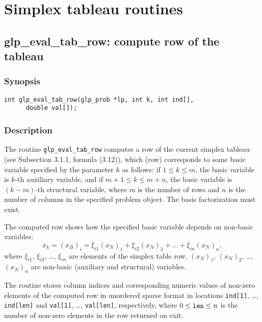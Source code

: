 
\newpage

\section{Simplex tableau routines}

\subsection{glp\_eval\_tab\_row: compute row of the tableau}

\subsubsection*{Synopsis}

\begin{verbatim}
int glp_eval_tab_row(glp_prob *lp, int k, int ind[],
      double val[]);
\end{verbatim}

\subsubsection*{Description}

The routine \verb|glp_eval_tab_row| computes a row of the current
simplex tableau (see Subsection 3.1.1, formula (3.12)), which (row)
corresponds to some basic variable specified by the parameter $k$ as
follows: if $1\leq k\leq m$, the basic variable is $k$-th auxiliary
variable, and if $m+1\leq k\leq m+n$, the basic variable is $(k-m)$-th
structural variable, where $m$ is the number of rows and $n$ is the
number of columns in the specified problem object. The basis
factorization must exist.

The computed row shows how the specified basic variable depends on
non-basic variables:
$$x_k=(x_B)_i=\xi_{i1}(x_N)_1+\xi_{i2}(x_N)_2+\dots+\xi_{in}(x_N)_n,$$
where $\xi_{i1}$, $\xi_{i2}$, \dots, $\xi_{in}$ are elements of the
simplex table row, $(x_N)_1$, $(x_N)_2$, \dots, $(x_N)_n$ are non-basic
(auxiliary and structural) variables.

The routine stores column indices and corresponding numeric values of
non-zero elements of the computed row in unordered sparse format in
locations \verb|ind[1]|, \dots, \verb|ind[len]| and \verb|val[1]|,
\dots, \verb|val[len]|, respectively, where $0\leq{\tt len}\leq n$ is
the number of non-zero elements in the row returned on exit.

